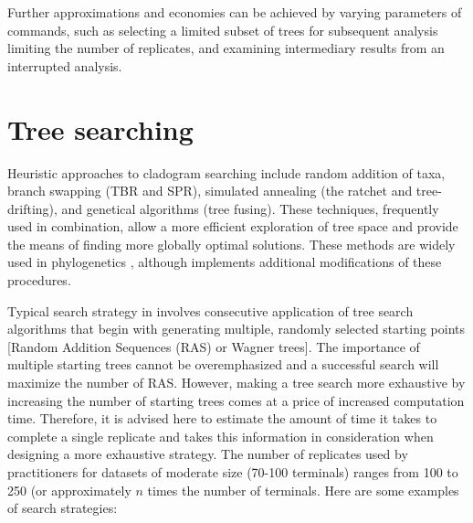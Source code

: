 Further approximations and economies can be achieved by varying
parameters of commands, such as selecting a limited subset of trees
for subsequent analysis limiting the number of replicates, and
examining intermediary results from an interrupted analysis.

\section{Tree searching}
Heuristic approaches to cladogram searching include random addition
of taxa, branch swapping (TBR and SPR), simulated annealing (the
ratchet and tree-drifting), and genetical algorithms (tree fusing).
These techniques, frequently used in combination, allow a more
efficient exploration of tree space and provide the means of finding
more globally optimal solutions. These methods are widely used in
phylogenetics \cite{felsenstein2004a, wheeleretal2006}, although
\poy implements additional modifications of these procedures.

Typical search strategy in \poy involves consecutive application
of tree search algorithms that begin with generating multiple,
randomly selected starting points [Random Addition Sequences (RAS)
or Wagner trees]. The importance of multiple starting trees cannot
be overemphasized and a successful search will maximize the number
of RAS.
 However, making a tree search more exhaustive by increasing the
 number of starting trees comes at a price of increased computation
 time. Therefore, it is advised here to estimate the amount of time
 it takes to complete a single replicate and takes this information
 in consideration when designing a more exhaustive strategy. The
 number of replicates used by \poy practitioners for datasets of
 moderate size (70-100 terminals) ranges from 100 to 250 (or
 approximately $n$ times the number of terminals. Here are some
 examples of search strategies:

